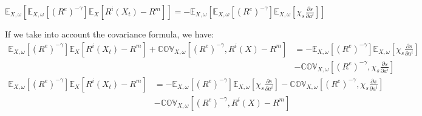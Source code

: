 \begin{center}
$\mathbb{E}_{X,\omega}\left[\mathbb{E}_{X,\omega}\left[\left(R^{e}\right)^{-\gamma}\right]\mathbb{E}_{X}\left[R^{i}\left(X_{t}\right)-R^{m}\right]\right]=-\mathbb{E}_{X,\omega}\left[\mathbb{E}_{X,\omega}\left[\left(R^{e}\right)^{-\gamma}\right]\mathbb{E}_{X,\omega}\left[\chi_{s}\frac{\partial s}{\partial a^{i}}\right]\right]$
\par\end{center}

\begin{flushleft}
{\small If we take into account the covariance formula, we have:}{\scriptsize{}
}
\begin{align*}
\mathbb{E}_{X,\omega}\left[\left(R^{e}\right)^{-\gamma}\right]\mathbb{E}_{X}\left[R^{i}\left(X_{t}\right)-R^{m}\right]+\mathbb{COV}_{X,\omega}\left[\left(R^{e}\right)^{-\gamma},R^{i}\left(X\right)-R^{m}\right] & =-\mathbb{E}_{X,\omega}\left[\left(R^{e}\right)^{-\gamma}\right]\mathbb{E}_{X,\omega}\left[\chi_{s}\frac{\partial s}{\partial a^{i}}\right]\\
 & \mathbb{-COV}_{X,\omega}\left[\left(R^{e}\right)^{-\gamma},\chi_{s}\frac{\partial s}{\partial a^{i}}\right]
\end{align*}
\begin{align*}
\mathbb{E}_{X,\omega}\left[\left(R^{e}\right)^{-\gamma}\right]\mathbb{E}_{X}\left[R^{i}\left(X_{t}\right)-R^{m}\right] & =-\mathbb{E}_{X,\omega}\left[\left(R^{e}\right)^{-\gamma}\right]\mathbb{E}_{X,\omega}\left[\chi_{s}\frac{\partial s}{\partial a^{i}}\right]-\mathbb{COV}_{X,\omega}\left[\left(R^{e}\right)^{-\gamma},\chi_{s}\frac{\partial s}{\partial a^{i}}\right]\\
 & -\mathbb{COV}_{X,\omega}\left[\left(R^{e}\right)^{-\gamma},R^{i}\left(X\right)-R^{m}\right]
\end{align*}
\par\end{flushleft}

